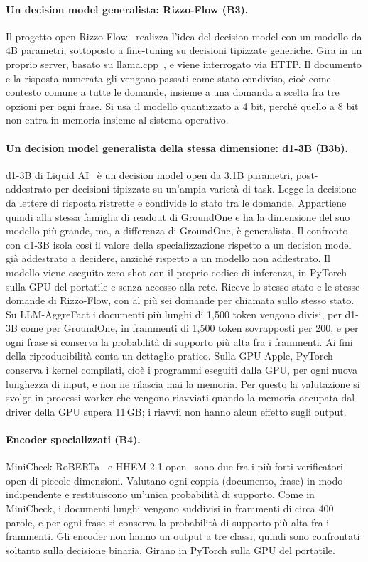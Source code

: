 \paragraph{Un decision model generalista: Rizzo-Flow (B3).} Il progetto open Rizzo-Flow~\cite{rizzoflow} realizza l'idea del
decision model con un modello da 4B parametri, sottoposto a fine-tuning su decisioni tipizzate generiche. Gira in un proprio
server, basato su llama.cpp~\cite{llamacpp}, e viene interrogato via HTTP. Il documento e la risposta numerata gli
vengono passati come stato condiviso, cioè come contesto comune a tutte le domande, insieme a una domanda a scelta fra
tre opzioni per ogni frase. Si usa il modello quantizzato a 4 bit, perché quello a 8 bit non entra in memoria insieme al
sistema operativo.

\paragraph{Un decision model generalista della stessa dimensione: d1-3B (B3b).} d1-3B di Liquid AI~\cite{liquid2026d1} è
un decision model open da 3.1B parametri, post-addestrato per decisioni tipizzate su un'ampia varietà di task. Legge la
decisione da lettere di risposta ristrette e condivide lo stato tra le domande. Appartiene quindi alla stessa famiglia di
readout di GroundOne e ha la dimensione del suo modello più grande, ma, a differenza di GroundOne, è generalista. Il
confronto con d1-3B isola così il valore della specializzazione rispetto a un decision model già addestrato a decidere,
anziché rispetto a un modello non addestrato. Il modello viene eseguito zero-shot con il proprio codice di inferenza, in
PyTorch sulla GPU del portatile e senza accesso alla rete. Riceve lo stesso stato e le stesse domande di Rizzo-Flow, con
al più sei domande per chiamata sullo stesso stato. Su LLM-AggreFact i documenti più lunghi di 1{,}500 token vengono divisi, per d1-3B come per GroundOne, in frammenti di 1{,}500 token sovrapposti per 200, e per ogni frase si conserva la probabilità di supporto più alta fra i frammenti. Ai fini della riproducibilità conta un dettaglio pratico. Sulla GPU
Apple, PyTorch conserva i kernel compilati, cioè i programmi eseguiti dalla GPU, per ogni nuova lunghezza di input, e
non ne rilascia mai la memoria. Per questo la valutazione si svolge in processi worker che vengono riavviati quando la
memoria occupata dal driver della GPU supera 11\,GB; i riavvii non hanno alcun effetto sugli output.

\paragraph{Encoder specializzati (B4).} MiniCheck-RoBERTa~\cite{tang2024minicheck} e HHEM-2.1-open~\cite{vectara2024hhem}
sono due fra i più forti verificatori open di piccole dimensioni. Valutano ogni coppia (documento, frase) in modo
indipendente e restituiscono un'unica probabilità di supporto. Come in MiniCheck, i documenti lunghi vengono suddivisi in
frammenti di circa 400 parole, e per ogni frase si conserva la probabilità di supporto più alta fra i frammenti. Gli encoder non hanno un output a tre classi,
quindi sono confrontati soltanto sulla decisione binaria. Girano in PyTorch sulla GPU del portatile.

